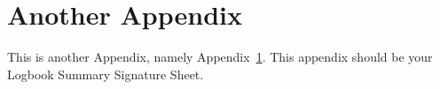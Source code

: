 \chapter{Another Appendix}\label{app:logbook}

This is another Appendix, namely Appendix~\ref{app:logbook}. This appendix
should be your Logbook Summary Signature Sheet.
